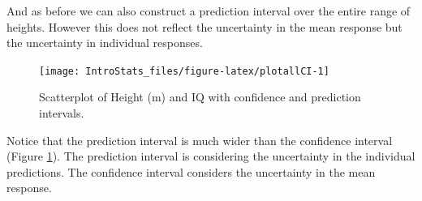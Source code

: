 \documentclass[
  oneside]{krantz}
\newenvironment{Shaded}{\begin{snugshade}}{\end{snugshade}}
\newcommand{\AttributeTok}[1]{\textcolor[rgb]{0.77,0.63,0.00}{#1}}
\newcommand{\CommentTok}[1]{\textcolor[rgb]{0.56,0.35,0.01}{\textit{#1}}}
\newcommand{\ConstantTok}[1]{\textcolor[rgb]{0.00,0.00,0.00}{#1}}
\newcommand{\DecValTok}[1]{\textcolor[rgb]{0.00,0.00,0.81}{#1}}
\newcommand{\FloatTok}[1]{\textcolor[rgb]{0.00,0.00,0.81}{#1}}
\newcommand{\FunctionTok}[1]{\textcolor[rgb]{0.00,0.00,0.00}{#1}}
\newcommand{\NormalTok}[1]{#1}
\newcommand{\OtherTok}[1]{\textcolor[rgb]{0.56,0.35,0.01}{#1}}
\newcommand{\SpecialCharTok}[1]{\textcolor[rgb]{0.00,0.00,0.00}{#1}}
\newcommand{\StringTok}[1]{\textcolor[rgb]{0.31,0.60,0.02}{#1}}
\begin{document}
And as before we can also construct a prediction interval over the entire range of heights. However this does not reflect the uncertainty in the mean response but the uncertainty in individual responses.

\newpage

\begin{Shaded}
\end{Shaded}

\begin{figure}

{\centering \texttt{[image: IntroStats\_files/figure-latex/plotallCI-1]} 

}

\caption{Scatterplot of Height (m) and IQ with confidence and prediction intervals.}\label{fig:plotallCI}
\end{figure}

Notice that the prediction interval is much wider than the confidence interval (Figure \ref{fig:plotallCI}). The prediction interval is considering the uncertainty in the individual predictions. The confidence interval considers the uncertainty in the mean response.
\end{document}
